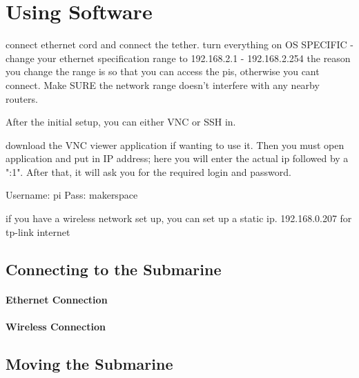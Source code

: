 \documentclass[
18pt, %
a4paper, %
oneside, %
headinclude,footinclude, %
]{scrartcl}
\begin{document}


\section{Using Software}
 connect ethernet cord and connect the tether.
turn everything on
OS SPECIFIC - change your ethernet specification range to 192.168.2.1 - 192.168.2.254
the reason you change the range is so that you can access the pis, otherwise you cant connect. Make SURE the network range doesn't interfere with any nearby routers.

After the initial setup, you can either VNC or SSH in.

download the VNC viewer application if wanting to use it. Then you must open application and put in IP address; here you will enter the actual ip followed by a ":1". After that, it will ask you for the required login and password.

Username: pi
Pass: makerspace

if you have a wireless network set up, you can set up a static ip. 192.168.0.207 for tp-link internet


\subsection{Connecting to the Submarine}

\paragraph{Ethernet Connection}
\paragraph{Wireless Connection}




\subsection{Moving the Submarine}
\end{document}
